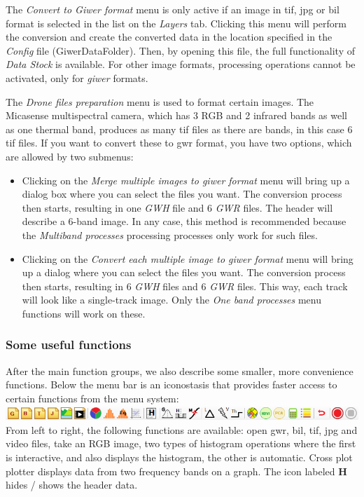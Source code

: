 \documentclass[a4paper,12pt]{article}
\begin{document}
The \textit {Convert to Giwer format} menu is only active if an image in tif, jpg or bil format is selected in the list on the \textit {Layers} tab. Clicking this menu will perform the conversion and create the converted data in the location specified in the \textit {Config} file (GiwerDataFolder). Then, by opening this file, the full functionality of \textit {Data Stock} is available. For other image formats, processing operations cannot be activated, only for \textit {giwer} formats.

The \textit {Drone files preparation} menu is used to format certain images. The Micasense multispectral camera, which has 3 RGB and 2 infrared bands as well as one thermal band, produces as many tif files as there are bands, in this case 6 tif files. If you want to convert these to gwr format, you have two options, which are allowed by two submenus: 

\begin{itemize}
	\item Clicking on the \textit {Merge multiple images to giwer format} menu will bring up a dialog box where you can select the files you want. The conversion process then starts, resulting in one \textit {GWH} file and 6 \textit {GWR} files. The header will describe a 6-band image. In any case, this method is recommended because the \textit {Multiband processes} processing processes only work for such files. 
	
	\item Clicking on the \textit {Convert each multiple image to giwer format} menu will bring up a dialog where you can select the files you want. The conversion process then starts, resulting in 6 \textit {GWH} files and 6 \textit {GWR} files. This way, each track will look like a single-track image. Only the \textit {One band processes} menu functions will work on these. 
\end{itemize}

\subsubsection{Some useful functions}

After the main function groups, we also describe some smaller, more convenience functions. Below the menu bar is an iconostasis that provides faster access to certain functions from the menu system: \\
\includegraphics [height = 0.55cm] {ikonosztaz.png} \\ 
From left to right, the following functions are available: open gwr, bil, tif, jpg and video files, take an RGB image, two types of histogram operations where the first is interactive, and also displays the histogram, the other is automatic. Cross plot plotter displays data from two frequency bands on a graph. The icon labeled \textbf {H} hides / shows the header data.
\end{document}
